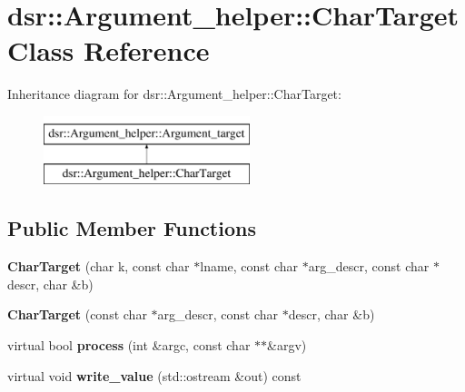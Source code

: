 \hypertarget{classdsr_1_1_argument__helper_1_1_char_target}{
\section{dsr::Argument\_\-helper::CharTarget Class Reference}
\label{classdsr_1_1_argument__helper_1_1_char_target}
}
Inheritance diagram for dsr::Argument\_\-helper::CharTarget:\begin{figure}[H]
\begin{center}
\leavevmode
\includegraphics[height=2.000000cm]{classdsr_1_1_argument__helper_1_1_char_target}
\end{center}
\end{figure}
\subsection*{Public Member Functions}
\begin{DoxyCompactItemize}
\item 
\hypertarget{classdsr_1_1_argument__helper_1_1_char_target_a67e0d2c68b25ac08847ddcff8f83f626}{
{\bfseries CharTarget} (char k, const char $\ast$lname, const char $\ast$arg\_\-descr, const char $\ast$descr, char \&b)}
\label{classdsr_1_1_argument__helper_1_1_char_target_a67e0d2c68b25ac08847ddcff8f83f626}

\item 
\hypertarget{classdsr_1_1_argument__helper_1_1_char_target_ad5bb65eb61f4401f4b166b3bd6f9a0c3}{
{\bfseries CharTarget} (const char $\ast$arg\_\-descr, const char $\ast$descr, char \&b)}
\label{classdsr_1_1_argument__helper_1_1_char_target_ad5bb65eb61f4401f4b166b3bd6f9a0c3}

\item 
\hypertarget{classdsr_1_1_argument__helper_1_1_char_target_ac8a645a4a92249301251a8b4df20c7de}{
virtual bool {\bfseries process} (int \&argc, const char $\ast$$\ast$\&argv)}
\label{classdsr_1_1_argument__helper_1_1_char_target_ac8a645a4a92249301251a8b4df20c7de}

\item 
\hypertarget{classdsr_1_1_argument__helper_1_1_char_target_a911c060da0c153e07dbd0241441e3fc0}{
virtual void {\bfseries write\_\-value} (std::ostream \&out) const }
\label{classdsr_1_1_argument__helper_1_1_char_target_a911c060da0c153e07dbd0241441e3fc0}

\end{DoxyCompactItemize}
